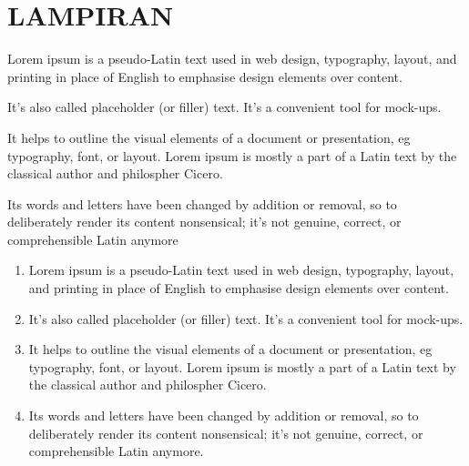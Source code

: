 
  \chapter*{LAMPIRAN}%

\appendix
{}
Lorem ipsum is a pseudo-Latin text used in web design, typography, layout, and printing in place of English to emphasise design elements over content. 
		
 It's also called placeholder (or filler) text. It's a convenient tool for mock-ups. 
		
 It helps to outline the visual elements of a document or presentation, eg typography, font, or layout. Lorem ipsum is mostly a part of a Latin text by the classical author and philospher Cicero.

Its words and letters have been changed by addition or removal, so to deliberately render its content nonsensical; it's not genuine, correct, or comprehensible Latin anymore



	\begin{enumerate}
		\item Lorem ipsum is a pseudo-Latin text used in web design, typography, layout, and printing in place of English to emphasise design elements over content. 
		
		\item It's also called placeholder (or filler) text. It's a convenient tool for mock-ups. 
		
		\item It helps to outline the visual elements of a document or presentation, eg typography, font, or layout. Lorem ipsum is mostly a part of a Latin text by the classical author and philospher Cicero.

		\item Its words and letters have been changed by addition or removal, so to deliberately render its content nonsensical; it's not genuine, correct, or comprehensible Latin anymore. 
	\end{enumerate}

	

